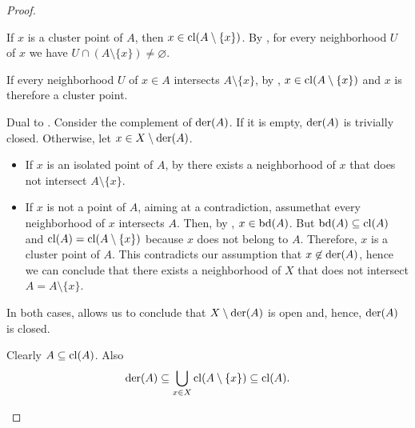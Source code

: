 \begin{proof}\mbox{}
  \begin{description}
    \mbox{}
    \begin{description}
      \Implies If \( x \) is a cluster point of \( A \), then \( x \in \operatorname{cl}(A \setminus \{ x \}) \). By , for every neighborhood \( U \) of \( x \) we have \( U \cap (A \setminus \{ x \}) \neq \varnothing \).

      \ImpliedBy If every neighborhood \( U \) of \( x \in A \) intersects \( A \setminus \{ x \} \), by , \( x \in \operatorname{cl}(A \setminus \{ x \}) \) and \( x \) is therefore a cluster point.
    \end{description}

     Dual to .
     Consider the complement of \( \operatorname{der}(A) \). If it is empty, \( \operatorname{der}(A) \) is trivially closed. Otherwise, let \( x \in X \setminus \operatorname{der}(A) \).

    \begin{itemize}
      \item If \( x \) is an isolated point of \( A \), by  there exists a neighborhood of \( x \) that does not intersect \( A \setminus \{ x \} \).
      \item If \( x \) is not a point of \( A \), aiming at a contradiction, assume\LEM that every neighborhood of \( x \) intersects \( A \). Then, by , \( x \in \operatorname{bd}(A) \). But \( \operatorname{bd}(A) \subseteq \operatorname{cl}(A) \) and \( \operatorname{cl}(A) = \operatorname{cl}(A \setminus \{ x \}) \) because \( x \) does not belong to \( A \). Therefore, \( x \) is a cluster point of \( A \). This contradicts our assumption that \( x \not\in \operatorname{der}(A) \), hence we can conclude that there exists a neighborhood of \( X \) that does not intersect \( A = A \setminus \{ x \} \).
    \end{itemize}

    In both cases,  allows us to conclude that \( X \setminus \operatorname{der}(A) \) is open and, hence, \( \operatorname{der}(A) \) is closed.

     Clearly \( A \subseteq \operatorname{cl}(A) \). Also
    \begin{equation*}
      \operatorname{der}(A) \subseteq \bigcup_{x \in X} \operatorname{cl}(A \setminus \{ x \}) \subseteq \operatorname{cl}(A).
    \end{equation*}


\end{description}
\end{proof}
